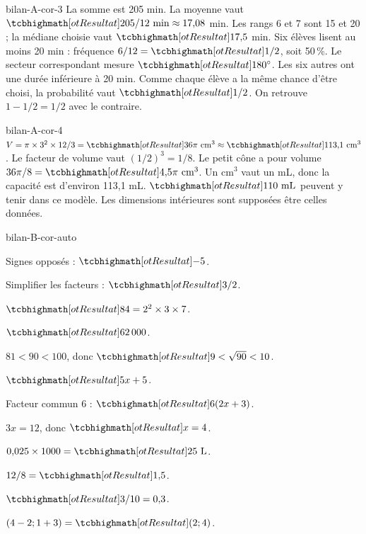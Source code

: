 \begin{blocEdition}{bilan-A-cor-3}
La somme est 205 min. La moyenne vaut $\res{205/12\ \mathrm{min}}\approx17{,}08$ min. Les rangs 6 et 7 sont 15 et 20 ; la médiane choisie vaut $\res{17{,}5}$ min.
Six élèves lisent au moins 20 min : fréquence $6/12=\res{1/2}$, soit 50\,\%. Le secteur correspondant mesure $\res{180^\circ}$.
Les six autres ont une durée inférieure à 20 min. Comme chaque élève a la même chance d’être choisi, la probabilité vaut $\res{1/2}$. On retrouve $1-1/2=1/2$ avec le contraire.
\end{blocEdition}
\begin{blocEdition}{bilan-A-cor-4}
$V=\pi\times3^2\times12/3=\res{36\pi\ \mathrm{cm}^3}\approx\res{113{,}1\ \mathrm{cm}^3}$.
Le facteur de volume vaut $(1/2)^3=1/8$. Le petit cône a pour volume $36\pi/8=\res{4{,}5\pi\ \mathrm{cm}^3}$.
Un cm$^3$ vaut un mL, donc la capacité est d’environ 113,1 mL. $\res{110\ \mathrm{mL}}$ peuvent y tenir dans ce modèle. Les dimensions intérieures sont supposées être celles données.\label{fig-bilan-A-cor-4}

\end{blocEdition}
\begin{blocEdition}{bilan-B-cor-auto}
\begin{questions}
\item Signes opposés : $\res{-5}$.
\item Simplifier les facteurs : $\res{3/2}$.
\item $\res{84=2^2\times3\times7}$.
\item $\res{62\,000}$.
\item $81<90<100$, donc $\res{9<\sqrt{90}<10}$.
\item $\res{5x+5}$.
\item Facteur commun 6 : $\res{6(2x+3)}$.
\item $3x=12$, donc $\res{x=4}$.
\item $0{,}025\times1000=\res{25\ \mathrm L}$.
\item $12/8=\res{1{,}5}$.
\item $\res{3/10=0{,}3}$.
\item $(4-2;1+3)=\res{(2;4)}$.\end{questions}
\end{blocEdition}

